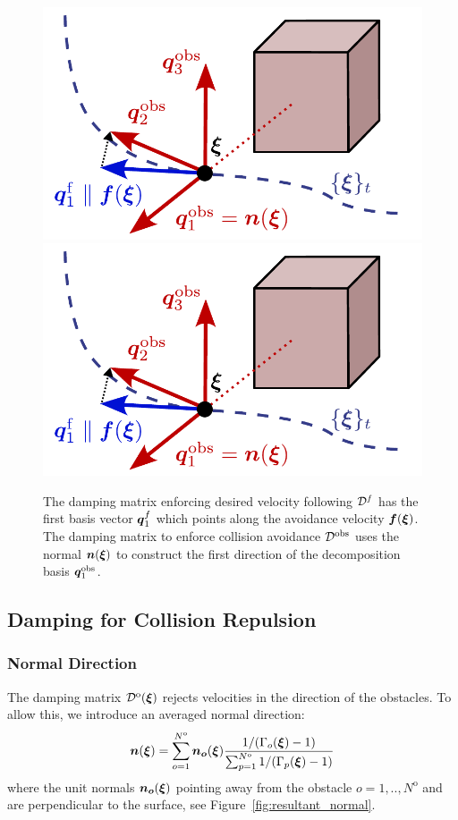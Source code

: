 \iflong
\begin{figure}
  \center
  \ifthesis
  \includegraphics[width=0.5\columnwidth]{figures/damping_basis_construction.pdf}
  \else
  \includegraphics[width=1\columnwidth]{figures/damping_basis_construction.pdf}
  \fi
\caption{The damping matrix enforcing desired velocity following $\mathcal{D}^{f}$ has the first basis vector $\boldsymbol{q}_1^{f}$ which points along the avoidance velocity $\boldsymbol{f}(\boldsymbol{\xi})$. The damping matrix to enforce collision avoidance $\mathcal{D}^{\mathrm{obs}}$ uses the normal $\boldsymbol{n}(\boldsymbol{\xi})$ to construct the first direction of the decomposition basis $\boldsymbol{q}^{\mathrm{obs}}_1$.}
\label{fig:damping_basis_construction}
\end{figure}
\fi

\subsection{Damping for Collision Repulsion} \label{sec:obstacle_repulsion}

\subsubsection{Normal Direction}
The damping matrix $\mathcal{D}^{\mathrm{o}}(\boldsymbol{\xi})$ rejects velocities in the direction of the obstacles. To allow this, we introduce an averaged normal direction:
\begin{equation}
  \boldsymbol{n}(\boldsymbol{\xi}) = \sum_{o=1}^{N^{\mathrm{o}}} \boldsymbol{n_o}(\boldsymbol{\xi})
  \frac{1 / (\Gamma_o(\boldsymbol{\xi}) - 1)}{\sum_{p=1}^{N^\mathrm{o}} 1 / (\Gamma_p(\boldsymbol{\xi}) - 1)}
  \label{eq:averaged_normal}
\end{equation}
 where the unit normals $\boldsymbol{n_o} (\boldsymbol{\xi})$ pointing away from the obstacle $o = 1,  ..,  N^{\mathrm{o}}$ and are perpendicular to the surface, see Figure~\ref{fig:resultant_normal}. 


